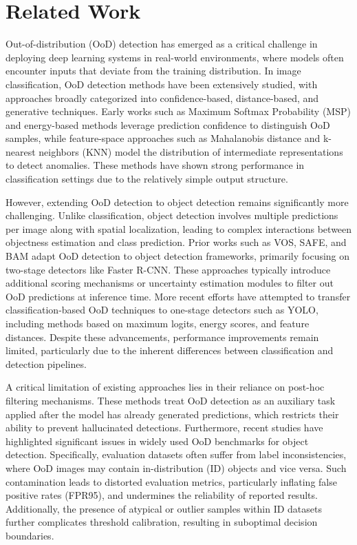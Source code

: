 \section{Related Work}
\label{sec:related}

Out-of-distribution (OoD) detection has emerged as a critical challenge in deploying deep learning systems in real-world environments, where models often encounter inputs that deviate from the training distribution.
In image classification, OoD detection methods have been extensively studied, with approaches broadly categorized into confidence-based, distance-based, and generative techniques.
Early works such as Maximum Softmax Probability (MSP) and energy-based methods leverage prediction confidence to distinguish OoD samples, while feature-space approaches such as Mahalanobis distance and k-nearest neighbors (KNN) model the distribution of intermediate representations to detect anomalies.
These methods have shown strong performance in classification settings due to the relatively simple output structure.

However, extending OoD detection to object detection remains significantly more challenging.
Unlike classification, object detection involves multiple predictions per image along with spatial localization, leading to complex interactions between objectness estimation and class prediction.
Prior works such as VOS, SAFE, and BAM adapt OoD detection to object detection frameworks, primarily focusing on two-stage detectors like Faster R-CNN.
These approaches typically introduce additional scoring mechanisms or uncertainty estimation modules to filter out OoD predictions at inference time.
More recent efforts have attempted to transfer classification-based OoD techniques to one-stage detectors such as YOLO, including methods based on maximum logits, energy scores, and feature distances.
Despite these advancements, performance improvements remain limited, particularly due to the inherent differences between classification and detection pipelines.

A critical limitation of existing approaches lies in their reliance on post-hoc filtering mechanisms.
These methods treat OoD detection as an auxiliary task applied after the model has already generated predictions, which restricts their ability to prevent hallucinated detections.
Furthermore, recent studies have highlighted significant issues in widely used OoD benchmarks for object detection.
Specifically, evaluation datasets often suffer from label inconsistencies, where OoD images may contain in-distribution (ID) objects and vice versa.
Such contamination leads to distorted evaluation metrics, particularly inflating false positive rates (FPR95), and undermines the reliability of reported results.
Additionally, the presence of atypical or outlier samples within ID datasets further complicates threshold calibration, resulting in suboptimal decision boundaries.

